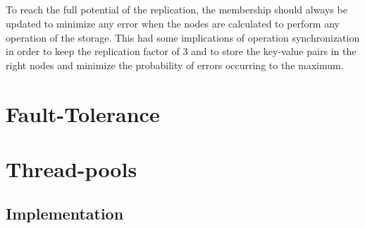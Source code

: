 \documentclass{report}
\begin{document}
				\paragraph{} To reach the full potential of the replication, the membership
				should always be updated to minimize any error when the nodes are calculated
				to perform any operation of the storage. This had some implications of
				operation synchronization in order to keep the replication factor of
				3 and to store the key-value pairs in the right nodes and minimize the 
				probability of errors occurring to the maximum.

	\chapter{Fault-Tolerance}
	
	        \paragraph{}
	        
	        \paragraph{}

	\chapter{Thread-pools}
	
	        \paragraph{}
	        
	        \paragraph{}

			\section{Implementation}
	
				\paragraph{}
				
				\paragraph{}
\end{document}
